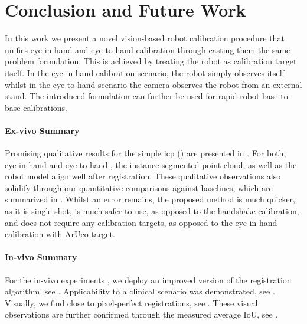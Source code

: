 
\section{Conclusion and Future Work}%
In this work we present a novel vision-based robot calibration procedure that unifies eye-in-hand and eye-to-hand calibration through casting them the same problem formulation. This is achieved by treating the robot as calibration target itself. In the eye-in-hand calibration scenario, the robot simply observes itself whilst in the eye-to-hand scenario the camera observes the robot from an external stand. The introduced formulation can further be used for rapid robot base-to-base calibrations.

\paragraph{Ex-vivo Summary} Promising qualitative results for the simple \acrshort{icp} () are presented in . For both, eye-in-hand  and eye-to-hand , the instance-segmented point cloud, as well as the robot model align well after registration. These qualitative observations also solidify through our quantitative comparisons against baselines, which are summarized in . Whilst an error remains, the proposed method is much quicker, as it is single shot, is much safer to use, as opposed to the handshake calibration, and does not require any calibration targets, as opposed to the eye-in-hand calibration with ArUco target.

\paragraph{In-vivo Summary} For the in-vivo experiments , we deploy an improved version of the registration algorithm, see . Applicability to a clinical scenario was demonstrated, see . Visually, we find close to pixel-perfect registrations, see . These visual observations are further confirmed through the measured average IoU, see .

